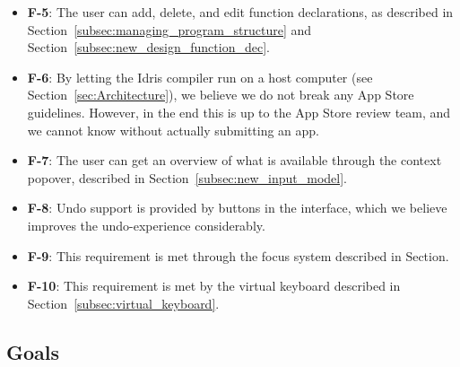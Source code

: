 \begin{itemize}
	\item \textbf{F-5}: The user can add, delete, and edit function declarations, as described in Section~\ref{subsec:managing_program_structure} and Section~\ref{subsec:new_design_function_dec}.
	\item \textbf{F-6}: By letting the Idris compiler run on a host computer (see Section~\ref{sec:Architecture}), we believe we do not break any App Store guidelines. However, in the end this is up to the App Store review team, and we cannot know without actually submitting an app.
	\item \textbf{F-7}: The user can get an overview of what is available through the context popover, described in Section~\ref{subsec:new_input_model}.
	\item \textbf{F-8}: Undo support is provided by buttons in the interface, which we believe improves the undo-experience considerably.
	\item \textbf{F-9}: This requirement is met through the focus system described in Section.
	\item \textbf{F-10}: This requirement is met by the virtual keyboard described in Section~\ref{subsec:virtual_keyboard}.
\end{itemize}

\subsection{Goals}

